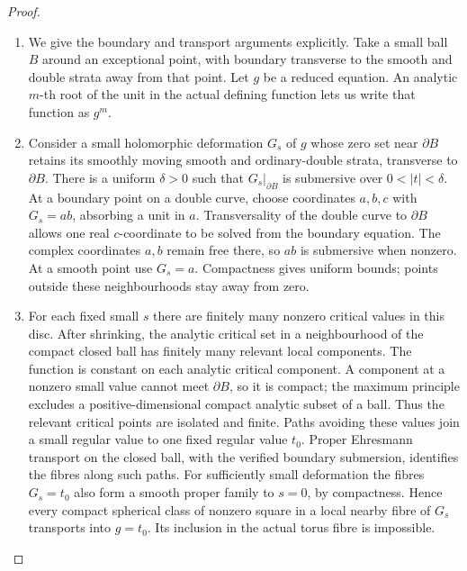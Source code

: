 \begin{proof}

\begin{enumerate}[label={$\langle1\rangle$\arabic*.},leftmargin=*]
\item We give the boundary and transport arguments explicitly.
Take a small ball $B$ around an exceptional point, with
boundary transverse to the smooth and double strata away
from that point. Let $g$ be a reduced equation. An analytic
$m$-th root of the unit in the actual defining function lets
us write that function as $g^m$.

\item Consider a small holomorphic deformation $G_s$ of $g$ whose
zero set near $\partial B$ retains its smoothly moving smooth
and ordinary-double strata, transverse to $\partial B$.
There is a uniform $\delta>0$ such that
$G_s|_{\partial B}$ is submersive over $0<|t|<\delta$.
At a boundary point on a double curve, choose coordinates
$a,b,c$ with $G_s=ab$, absorbing a unit in $a$.
Transversality of the double curve to $\partial B$ allows one
real $c$-coordinate to be solved from the boundary equation.
The complex coordinates $a,b$ remain free there, so $ab$ is
submersive when nonzero. At a smooth point use $G_s=a$.
Compactness gives uniform bounds; points outside these
neighbourhoods stay away from zero.

\item For each fixed small $s$ there are finitely many nonzero
critical values in this disc. After shrinking, the analytic
critical set in a neighbourhood of the compact closed ball
has finitely many relevant local components. The function is constant on
each analytic critical component. A component at a nonzero
small value cannot meet $\partial B$, so it is compact;
the maximum principle excludes a positive-dimensional
compact analytic subset of a ball. Thus the relevant critical
points are isolated and finite. Paths avoiding these values
join a small regular value to one fixed regular value $t_0$.
Proper Ehresmann transport on the closed ball, with the
verified boundary submersion, identifies the fibres along
such paths. For sufficiently small deformation the fibres
$G_s=t_0$ also form a smooth proper family to $s=0$, by
compactness. Hence every compact spherical class of nonzero
square in a local nearby fibre of $G_s$ transports into
$g=t_0$. Its inclusion in the actual torus fibre is impossible.


\end{enumerate}
\end{proof}
